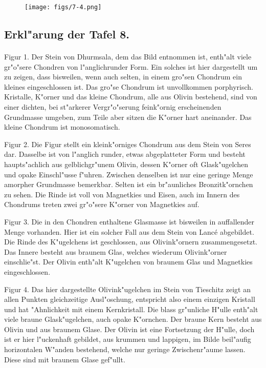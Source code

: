 \documentclass[a4paper, 11pt, oneside, polutonikogreek, german]{article}
\begin{document}
\vspace*{\fill}
\begin{figure}[H]
\centering
\texttt{[image: figs/7-4.png]}
\caption{}
\end{figure}
\vspace*{\fill}
\clearpage

\subsection{Erkl"arung der Tafel 8.}
\paragraph{}
Figur 1. Der Stein von Dhurmsala, dem das Bild entnommen ist, enth"alt viele gr"o"sere Chondren von l"anglichrunder Form. Ein solches ist hier dargestellt um zu zeigen, dass bisweilen, wenn auch selten, in einem gro"sen Chondrum ein kleines eingeschlossen ist. Das gro"se Chondrum ist unvollkommen porphyrisch. Kristalle, K"orner und das kleine Chondrum, alle aus Olivin bestehend, sind von einer dichten, bei st"arkerer Vergr"o"serung feink"ornig erscheinenden Grundmasse umgeben, zum Teile aber sitzen die K"orner hart aneinander. Das kleine Chondrum ist monosomatisch.

Figur 2. Die Figur stellt ein kleink"orniges Chondrum aus dem Stein von Seres dar. Dasselbe ist von l"anglich runder, etwas abgeplatteter Form und besteht haupts"achlich aus gelblichgr"unem Olivin, dessen K"orner oft Glask"ugelchen und opake Einschl"usse f"uhren. Zwischen denselben ist nur eine geringe Menge amorpher Grundmasse bemerkbar. Selten ist ein br"aunliches Bronzitk"ornchen zu sehen. Die Rinde ist voll von Magnetkies und Eisen, auch im Innern des Chondrums treten zwei gr"o"sere K"orner von Magnetkies auf.

Figur 3. Die in den Chondren enthaltene Glasmasse ist bisweilen in auffallender Menge vorhanden. Hier ist ein solcher Fall aus dem Stein von Lancé abgebildet. Die Rinde des K"ugelchens ist geschlossen, aus Olivink"ornern zusammengesetzt. Das Innere besteht aus braunem Glas, welches wiederum Olivink"orner einschlie"st. Der Olivin enth"alt K"ugelchen von braunem Glas und Magnetkies eingeschlossen.

Figur 4. Das hier dargestellte Olivink"ugelchen im Stein von Tieschitz zeigt an allen Punkten gleichzeitige Ausl"oschung, entspricht also einem einzigen Kristall und hat "Ahnlichkeit mit einem Kernkristall. Die blass gr"unliche H"ulle enth"alt viele braune Glask"ugelchen, auch opake K"ornchen. Der braune Kern besteht aus Olivin und aus braunem Glase. Der Olivin ist eine Fortsetzung der H"ulle, doch ist er hier l"uckenhaft gebildet, aus krummen und lappigen, im Bilde beil"aufig horizontalen W"anden bestehend, welche nur geringe Zwischenr"aume lassen. Diese sind mit braunem Glase gef"ullt.
\clearpage
\end{document}
